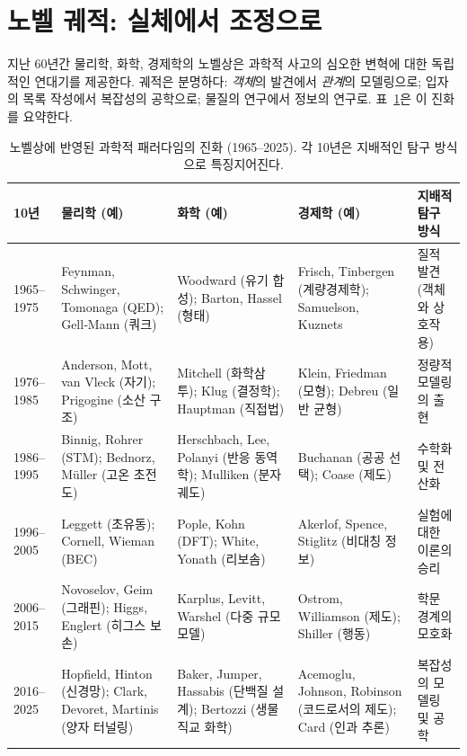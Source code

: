\documentclass[12pt,a4paper]{article}
\begin{document}
	\section{노벨 궤적: 실체에서 조정으로}
	
	지난 60년간 물리학, 화학, 경제학의 노벨상은 과학적 사고의 심오한 변혁에 대한 독립적인 연대기를 제공한다. 궤적은 분명하다: \emph{객체}의 발견에서 \emph{관계}의 모델링으로; 입자의 목록 작성에서 복잡성의 공학으로; 물질의 연구에서 정보의 연구로. 표~\ref{tab:nobel}은 이 진화를 요약한다.
	
	\begin{table}[htbp]
		\centering
		\caption{노벨상에 반영된 과학적 패러다임의 진화 (1965--2025). 각 10년은 지배적인 탐구 방식으로 특징지어진다.}
		\label{tab:nobel}
		\small
		\begin{tabular}{p{2.5cm}p{3.5cm}p{3.5cm}p{2.5cm}p{2.8cm}}
			\toprule
			\textbf{10년} & \textbf{물리학 (예)} & \textbf{화학 (예)} & \textbf{경제학 (예)} & \textbf{지배적 탐구 방식} \\
			\midrule
			1965--1975 & Feynman, Schwinger, Tomonaga (QED); Gell‑Mann (쿼크) & Woodward (유기 합성); Barton, Hassel (형태) & Frisch, Tinbergen (계량경제학); Samuelson, Kuznets & 질적 발견 (객체와 상호작용) \\
			1976--1985 & Anderson, Mott, van Vleck (자기); Prigogine (소산 구조) & Mitchell (화학삼투); Klug (결정학); Hauptman (직접법) & Klein, Friedman (모형); Debreu (일반 균형) & 정량적 모델링의 출현 \\
			1986--1995 & Binnig, Rohrer (STM); Bednorz, Müller (고온 초전도) & Herschbach, Lee, Polanyi (반응 동역학); Mulliken (분자 궤도) & Buchanan (공공 선택); Coase (제도) & 수학화 및 전산화 \\
			1996--2005 & Leggett (초유동); Cornell, Wieman (BEC) & Pople, Kohn (DFT); White, Yonath (리보솜) & Akerlof, Spence, Stiglitz (비대칭 정보) & 실험에 대한 이론의 승리 \\
			2006--2015 & Novoselov, Geim (그래핀); Higgs, Englert (히그스 보손) & Karplus, Levitt, Warshel (다중 규모 모델) & Ostrom, Williamson (제도); Shiller (행동) & 학문 경계의 모호화 \\
			2016--2025 & Hopfield, Hinton (신경망); Clark, Devoret, Martinis (양자 터널링) & Baker, Jumper, Hassabis (단백질 설계); Bertozzi (생물직교 화학) & Acemoglu, Johnson, Robinson (코드로서의 제도); Card (인과 추론) & 복잡성의 모델링 및 공학 \\
			\bottomrule
		\end{tabular}
	\end{table}
	
\end{document}
